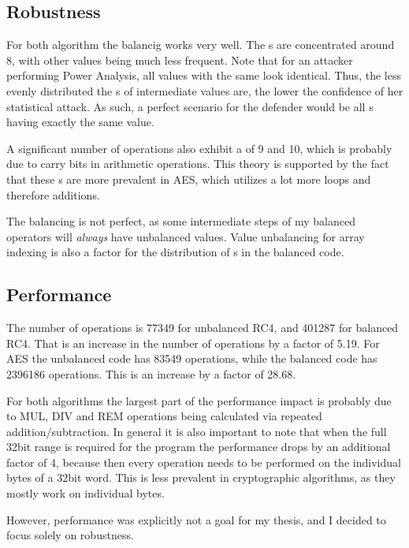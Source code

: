 \subsection{Robustness}
For both algorithm the balancig works very well.
The \hammingw{}s are concentrated around 8, with other values being much less frequent.
Note that for an attacker performing Power Analysis, all values with the same \hammingw{} look identical.
Thus, the less evenly distributed the \hammingw{}s of intermediate values are, the lower the confidence of her statistical attack.
As such, a perfect scenario for the defender would be all \hammingw{}s having exactly the same value.

A significant number of operations also exhibit a \hammingw{} of 9 and 10, which is probably due to carry bits in arithmetic operations.
This theory is supported by the fact that these \hammingw{}s are more prevalent in AES, which utilizes a lot more loops and therefore additions.

The balancing is not perfect, as some intermediate steps of my balanced operators will \emph{always} have unbalanced values.
Value unbalancing for array indexing is also a factor for the distribution of \hammingw{}s in the balanced code.

\subsection{Performance}
The number of operations is \num{77349} for unbalanced RC4, and \num{401287} for balanced RC4.
That is an increase in the number of operations by a factor of \num{5.19}.
For AES the unbalanced code has \num{83549} operations, while the balanced code has \num{2396186} operations.
This is an increase by a factor of \num{28.68}.

For both algorithms the largest part of the performance impact is probably due to MUL, DIV and REM operations being calculated via repeated addition/subtraction.
In general it is also important to note that when the full 32bit range is required for the program the performance drops by an additional factor of 4, because then every operation needs to be performed on the individual bytes of a 32bit word.
This is less prevalent in cryptographic algorithms, as they mostly work on individual bytes.

However, performance was explicitly not a goal for my thesis, and I decided to focus solely on robustness.
